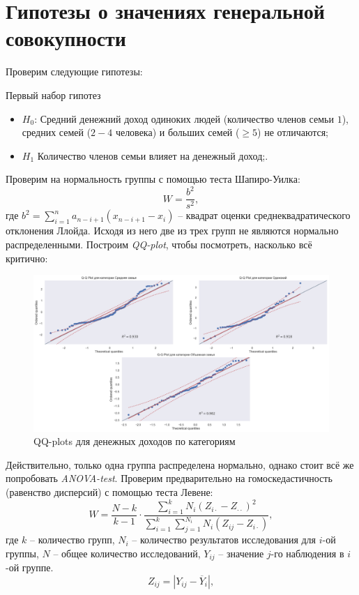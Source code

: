 \documentclass[12pt]{report}
\begin{document}
\section{Гипотезы о значениях генеральной совокупности}
Проверим следующие гипотезы:
\par
Первый набор гипотез
\begin{itemize}
  \item $H_0$: Средний денежний доход одиноких людей (количество членов семьи $1$), средних семей ($2-4$ человека) и больших семей ($\geq 5$) не отличаются;
  \item $H_1$  Количество членов семьи влияет на денежный доход;.
\end{itemize}
Проверим на нормальность группы с помощью теста Шапиро-Уилка:
\[
    W = \dfrac{b^2}{s^2},
\]
где $\displaystyle b^2 = \sum\limits_{i=1}^n a_{n-i+1}\left(x_{n-i+1} - x_i\right)$ -- квадрат оценки среднеквадратического отклонения Ллойда. Исходя из него две из трех групп не являются нормально распределенными. Построим \emph{QQ-plot}, чтобы посмотреть, насколько всё критично:
\begin{figure}[H]
  \centering
  \includegraphics[scale=0.45]{title/qqplot.png}
  \caption{QQ-plots для денежных доходов по категориям}
\end{figure}
Действительно, только одна группа распределена нормально, однако стоит всё же попробовать \emph{ANOVA-test}. Проверим предварительно на гомоскедастичность (равенство дисперсий) с помощью теста Левене:
\[
    W = \dfrac{N-k}{k-1} \cdot \dfrac{\sum\limits_{i=1}^k N_i\left(Z_{i\cdot} - Z_{\cdot\cdot}\right)^2}{\sum\limits_{i=1}^k \sum\limits_{j=1}^{N_i}N_i\left(Z_{ij} - Z_{i\cdot}\right)},
\]
где $k$ -- количество групп, $N_i$ -- количество результатов исследования для $i$-ой группы, $N$ -- общее количество исследований, $Y_{ij}$ -- значение $j$-го наблюдения в $i$-ой группе.
\[
    Z_{ij} = \left|Y_{ij} - \overline{Y}_i \right|,
\]
\end{document}
